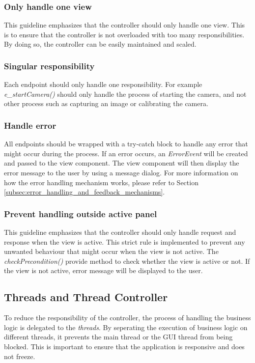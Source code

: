 \subsubsection{Only handle one view}
This guideline emphasizes that the controller should only handle one view. This is to ensure that the controller is not overloaded with too many responsibilities. By doing so, the controller can be easily maintained and scaled.

\subsubsection{Singular responsibility}
Each endpoint should only handle one responsibility. For example \textit{e\_startCamera()} should only handle the process of starting the camera, and not other process such as capturing an image or calibrating the camera.

\subsubsection{Handle error}
All endpoints should be wrapped with a try-catch block to handle any error that might occur during the process. If an error occurs, an \textit{ErrorEvent} will be created and passed to the view component. The view component will then display the error message to the user by using a message dialog. For more information on how the error handling mechanism works, please refer to Section \ref{subsec:error_handling_and_feedback_mechanisms}.

\subsubsection{Prevent handling outside active panel}
\label{subsec:prevent_handling_outside_active_panel}
This guideline emphasizes that the controller should only handle request and response when the view is active. This strict rule is implemented to prevent any unwanted behaviour that might occur when the view is not active. The \textit{checkPrecondition()} provide method to check whether the view is active or not. If the view is not active, error message will be displayed to the user.

\subsection{Threads and Thread Controller}
\label{subsec:thread_and_thread_controller}
To reduce the responsibility of the controller, the process of handling the business logic is delegated to the \textit{threads}. By seperating the execution of business logic on different threads, it prevents the main thread or the GUI thread from being blocked. This is important to ensure that the application is responsive and does not freeze.

